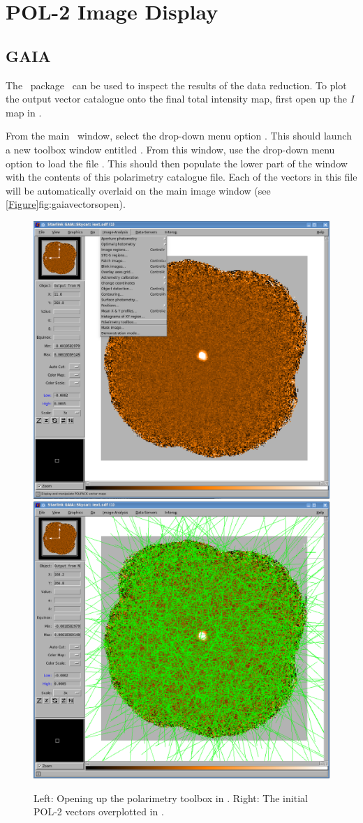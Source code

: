 \chapter{POL-2 Image Display}
\label{sec:display}

\section{GAIA}

The \starlink\ package \gaia\ can be used to inspect the results of
the data reduction.  To plot the output vector catalogue onto the
final total intensity map, first open up the $I$ map in \GAIA.

\begin{terminalv}
\end{terminalv}


From the main \GAIA\ window, select the drop-down menu option
. This should launch a
new toolbox window entitled . From this window, use
the drop-down menu option  to load the file
. This should then populate the lower part of the window
with the contents of this polarimetry catalogue file.  Each of the vectors
in this file will be automatically overlaid on the main image window
(see \cref{Figure}{fig:gaiavectorsopen}{}).

\begin{figure}[ht!]
\begin{center}
\includegraphics[width=0.46\linewidth]{sc22-gaia-plot-vectors-1.png}
\includegraphics[width=0.46\linewidth]{sc22-gaia-plot-vectors-3.png}
\caption [Over Plotting Vectors in GAIA]{
  Left: Opening up the polarimetry toolbox in \GAIA. Right: The initial POL-2
  vectors overplotted in \GAIA.
\label{fig:gaiavectorsopen}
}
\end{center}
\end{figure}

